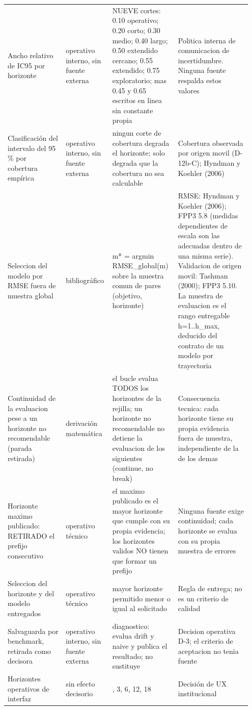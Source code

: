 {\begin{longtable}{@{}>{\raggedright\arraybackslash}p{0.238\linewidth}>{\raggedright\arraybackslash}p{0.152\linewidth}>{\raggedright\arraybackslash}p{0.266\linewidth}>{\raggedright\arraybackslash}p{0.295\linewidth}@{}}
Ancho relativo de IC95 por horizonte & operativo interno, sin fuente externa & NUEVE cortes: 0.10 operativo; 0.20 corto; 0.30 medio; 0.40 largo; 0.50 extendido cercano; 0.55 extendido; 0.75 exploratorio; mas 0.45 y 0.65 escritos en linea sin constante propia & Politica interna de comunicacion de incertidumbre. Ninguna fuente respalda estos valores \\
Clasificación del intervalo del 95 \% por cobertura empírica & operativo interno, sin fuente externa & ningun corte de cobertura degrada el horizonte; solo degrada que la cobertura no sea calculable & Cobertura observada por origen movil (D-12b-C); Hyndman y Koehler (2006) \\
Seleccion del modelo por RMSE fuera de muestra global & bibliográfico & m* = argmin RMSE\_\allowbreak{}global(m) sobre la muestra comun de pares (objetivo, horizonte) & RMSE: Hyndman y Koehler (2006); FPP3 5.8 (medidas dependientes de escala son las adecuadas dentro de una misma serie). Validacion de origen movil: Tashman (2000); FPP3 5.10. La muestra de evaluacion es el rango entregable h=1..h\_\allowbreak{}max, deducido del contrato de un modelo por trayectoria \\
Continuidad de la evaluacion pese a un horizonte no recomendable (parada retirada) & derivación matemática & el bucle evalua TODOS los horizontes de la rejilla; un horizonte no recomendable no detiene la evaluacion de los siguientes (continue, no break) & Consecuencia tecnica: cada horizonte tiene su propia evidencia fuera de muestra, independiente de la de los demas \\
Horizonte maximo publicado: RETIRADO el prefijo consecutivo & operativo técnico & el maximo publicado es el mayor horizonte que cumple con su propia evidencia; los horizontes validos NO tienen que formar un prefijo & Ninguna fuente exige continuidad; cada horizonte se evalua con su propia muestra de errores \\
Seleccion del horizonte y del modelo entregados & operativo técnico & mayor horizonte permitido menor o igual al solicitado & Regla de entrega; no es un criterio de calidad \\
Salvaguarda por benchmark, retirada como decisora & operativo interno, sin fuente externa & diagnostico: evalua drift y naive y publica el resultado; no sustituye & Decision operativa D-3; el criterio de aceptacion no tenia fuente \\
Horizontes operativos de interfaz & sin efecto decisorio & 1, 3, 6, 12, 18 & Decisión de UX institucional \\

\end{longtable}}
